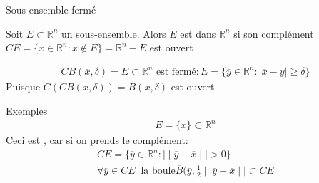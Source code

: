 \begin{parag}{Sous-ensemble fermé}
    \begin{definition}
        Soit $E \subset \mathbb{R}^n$ un sous-ensemble. Alors $E$ est  dans $ \mathbb{R}^n$ si son complément $CE = \{ \overline{x} \in \mathbb{R}^n : \overline{x} \notin E\} = \mathbb{R}^n - E$ est ouvert
    \end{definition}
    
        \begin{align*}
            CB( \overline{x}, \delta) = E \subset \mathbb{R}^n \text{ est fermé}: E = \{ \overline{y} \in \mathbb{R}^n : \mid  \overline{x} - y \mid \geq \delta \} 
        \end{align*}
            Puisque $C(CB( \overline{x}, \delta)) = B( \overline{x}, \delta)$ est ouvert.
\end{parag}
\begin{parag}{Exemples}
    \begin{align*}
        E = \{ \overline{x}\} \subset \mathbb{R}^n 
    \end{align*}
    Ceci est , car si on prends le complément:
    \begin{align*}
        CE = \{ \overline{y} \in \mathbb{R}^n : \mid \mid \overline{y} - \overline{x} \mid \mid > 0\} \\
        \forall \overline{y} \in CE\; \; \text{la boule} \overline{B}( \overline{y}, \frac{1}{2} \mid  \mid \overline{y} - \overline{x} \mid \mid \subset CE
    \end{align*}
    
    

\end{parag}

